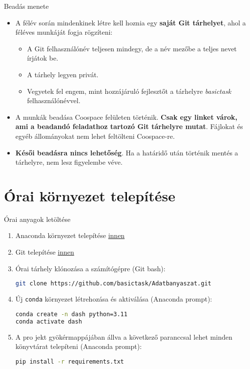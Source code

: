 \documentclass[english, aspectratio=169]{beamer}
\makeatletter
\let\origtableofcontents=\tableofcontents
\def\tableofcontents{\@ifnextchar[{\origtableofcontents}{\gobbletableofcontents}}
\def\gobbletableofcontents#1{\origtableofcontents}
\makeatother
\begin{document}
\begin{frame}{Beadás menete}
	\begin{itemize}
		\item A félév során mindenkinek létre kell hoznia egy \textbf{saját Git tárhelyet}, ahol a féléves munkáját fogja rögzíteni:
		\begin{itemize}
			\item A Git felhasználónév teljesen mindegy, de a név mezőbe a teljes nevet írjátok be. 
			\item A tárhely legyen privát. 
			\item Vegyetek fel engem, mint hozzájáruló fejlesztőt a tárhelyre \emph{basictask} felhasználónévvel. 
		\end{itemize}
		\item A munkák beadása Coospace felületen történik. \textbf{Csak egy linket várok, ami a beadandó feladathoz tartozó Git tárhelyre mutat}. Fájlokat és egyéb állományokat nem lehet feltölteni Coospace-re.
		\item \textbf{Késői beadásra nincs lehetőség}. Ha a határidő után történik mentés a tárhelyre, nem lesz figyelembe véve.
	\end{itemize}
\end{frame}

\section{Órai környezet telepítése}

\begin{frame}{}
	\tableofcontents[currentsection]
\end{frame}

\begin{frame}[fragile]{Órai anyagok letöltése}
	\begin{enumerate}
		\item Anaconda környezet telepítése \href{https://www.anaconda.com/download}{innen}
		\item Git telepítése \href{https://git-scm.com/downloads}{innen}
		\item Órai tárhely klónozása a számítógépre (Git bash):
		\begin{lstlisting}[language=bash]
git clone https://github.com/basictask/Adatbanyaszat.git
		\end{lstlisting}
		\item Új \texttt{conda} környezet létrehozása és aktiválása (Anaconda prompt):
		\begin{lstlisting}[language=bash]
conda create -n dash python=3.11
conda activate dash
		\end{lstlisting}
		\item A pro jekt gyökérmappájában állva a következő paranccsal lehet minden könyvtárat telepíteni (Anaconda prompt):
		\begin{lstlisting}[language=bash]
pip install -r requirements.txt
		\end{lstlisting}
	\end{enumerate}
\end{frame}
\end{document}
